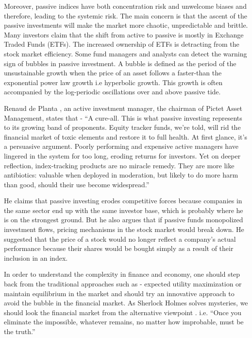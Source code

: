 Moreover, passive indices have both concentration risk and unwelcome biases and therefore, leading to the systemic risk. The main concern is that the ascent of the passive investments will make the market more chaotic, unpredictable and brittle. Many investors claim that the shift from active to passive is mostly in Exchange Traded Funds (ETFs). The increased ownership of ETFs is detracting from the stock market efficiency. Some fund managers and analysts can detect the warning sign of bubbles in passive investment. A bubble is defined as the period of the unsustainable growth when the price of an asset follows a faster-than the exponential power law growth i.e hyperbolic growth. This growth is often accompanied by the log-periodic oscillations over and above passive tide.

Renaud de Planta \cite{a3}, an active investment manager, the chairman of Pictet Asset Management, states that - ``A cure-all. This is what passive investing represents to its growing band of proponents. Equity tracker funds, we’re told, will rid the financial market of toxic elements and restore it to full health. At first glance, it’s a persuasive argument. Poorly performing and expensive active managers have lingered in the system for too long, eroding returns for investors. Yet on deeper reflection, index-tracking products are no miracle remedy. They are more like antibiotics: valuable when deployed in moderation, but likely to do more harm than good, should their use become widespread.''

He claims that passive investing erodes competitive forces because companies in the same sector end up with the same investor base, which is probably where he is on the strongest ground. But he also argues that if passive funds monopolized investment flows, pricing mechanisms in the stock market would break down. He suggested that the price of a stock would no longer reflect a company's actual performance because their shares would be bought simply as a result of their inclusion in an index.

In order to understand the complexity in finance and economy, one should step back from the traditional approaches such as - expected utility maximization or maintain equilibrium in the market and should try an innovative approach to avoid the bubble in the financial market. As Sherlock Holmes solves mysteries, we should look the financial market from the alternative viewpoint \cite{a4}. i.e.  ``Once you eliminate the impossible, whatever remains, no matter how improbable, must be the truth.''

